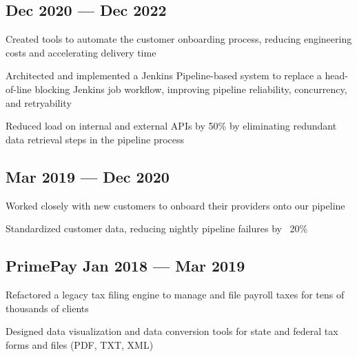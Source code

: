 \subsection{{\hfill Dec 2020 --- Dec 2022}}
\begin{zitemize}
\item Created tools to automate the customer onboarding process, reducing engineering costs and accelerating delivery time
\item Architected and implemented a Jenkins Pipeline-based system to replace a head-of-line blocking Jenkins job workflow, improving pipeline reliability, concurrency, and retryability
\item Reduced load on internal and external APIs by 50\% by eliminating redundant data retrieval steps in the pipeline process
\end{zitemize}

\subsection{{\hfill Mar 2019 --- Dec 2020}}
\begin{zitemize}
\item Worked closely with new customers to onboard their providers onto our pipeline
\item Standardized customer data, reducing nightly pipeline failures by ~20\%
\end{zitemize}

\subsection{{PrimePay \hfill Jan 2018 --- Mar 2019}}
\begin{zitemize}
\item Refactored a legacy tax filing engine to manage and file payroll taxes for tens of thousands of clients
\item Designed data visualization and data conversion tools for state and federal tax forms and files (PDF, TXT, XML)
\end{zitemize}

